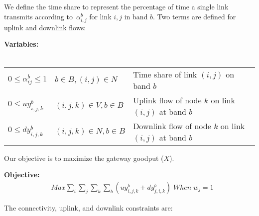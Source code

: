 
We define the time share to represent the percentage of time a 
single link transmits according to~$\alpha_{i,j}^b$
for link $i,j$ in band $b$. Two 
terms are defined for uplink and downlink flows:

\noindent
{\bf Variables:}\\
\\
\begin{tabular}{llp{3cm}}
$0\le \alpha_{ij}^b \le 1$  & $b\in B, (i,j) \in N$ & 
Time share of link $(i,j)$ on band $b$\\ 
$0\le uy_{i,j,k}^b$ & $(i,j,k) \in V, b \in B$ & 
Uplink flow of node $k$ on link $(i,j)$ at band $b$ \\ 
$0\le dy_{i,j,k}^b$ & $(i,j,k) \in N, b \in B$ & 
Downlink flow of node $k$ on link $(i,j)$ at band $b$ \\ 
\end{tabular}

Our objective is to maximize the gateway goodput ($X$).

\noindent
{\bf Objective:}
\begin{align}
& Max \sum_i\sum_j\sum_k\sum_b(uy_{i,j,k}^b+dy_{j,i,k}^b) \; When \; w_j=1
\end{align}

The connectivity, uplink, and downlink constraints are:  

